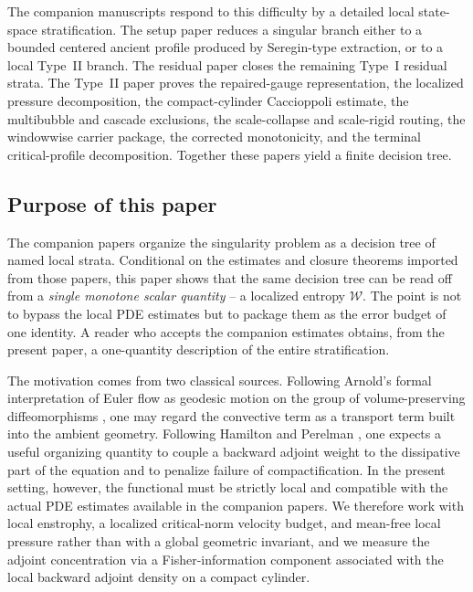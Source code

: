 \documentclass[11pt]{amsart}
\numberwithin{equation}{section}
\theoremstyle{plain}
\theoremstyle{definition}
\theoremstyle{remark}
\newcommand{\Wloc}{\mathcal W}
\begin{document}
The companion manuscripts \cite{BallesterSetup,BallesterResidual,BallesterTypeII}
respond to this difficulty by a detailed local state-space stratification.
The setup paper \cite{BallesterSetup} reduces a singular branch either to a
bounded centered ancient profile produced by Seregin-type extraction, or to
a local Type~II branch.  The residual paper \cite{BallesterResidual} closes
the remaining Type~I residual strata.  The Type~II paper
\cite{BallesterTypeII} proves the repaired-gauge representation, the
localized pressure decomposition, the compact-cylinder Caccioppoli estimate,
the multibubble and cascade exclusions, the scale-collapse and scale-rigid
routing, the windowwise carrier package, the corrected monotonicity, and
the terminal critical-profile decomposition.  Together these papers yield a
finite decision tree.

\subsection*{Purpose of this paper}

The companion papers organize the singularity problem as a decision tree of
named local strata.  Conditional on the estimates and closure theorems
imported from those papers, this paper shows that the same decision tree can
be read off from a \emph{single monotone scalar quantity} -- a localized
entropy \(\Wloc\).  The point is not to bypass the local PDE estimates but
to package them as the error budget of one identity.  A reader who accepts
the companion estimates obtains, from the present paper, a one-quantity
description of the entire stratification.

The motivation comes from two classical sources.  Following Arnold's formal
interpretation of Euler flow as geodesic motion on the group of
volume-preserving diffeomorphisms \cite{Arnold1966,EbinMarsden1970}, one may
regard the convective term as a transport term built into the ambient
geometry.  Following Hamilton and Perelman \cite{Hamilton1982,Perelman2002},
one expects a useful organizing quantity to couple a backward adjoint weight
to the dissipative part of the equation and to penalize failure of
compactification.  In the present setting, however, the functional must be
strictly local and compatible with the actual PDE estimates available in the
companion papers.  We therefore work with local enstrophy, a localized
critical-norm velocity budget, and mean-free local pressure rather than with
a global geometric invariant, and we measure the adjoint concentration via a
Fisher-information component associated with the local backward adjoint
density on a compact cylinder.
\end{document}

